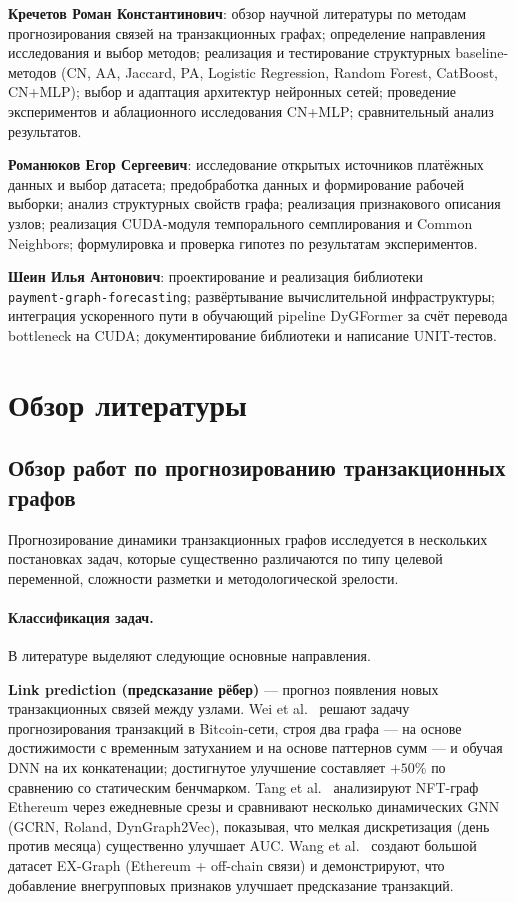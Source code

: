 \documentclass[a4paper,12pt]{extarticle}
\begin{document}
\textbf{Кречетов Роман Константинович}: 
обзор научной литературы по методам прогнозирования связей на транзакционных графах; 
определение направления исследования и выбор методов; 
реализация и тестирование структурных baseline-методов (CN, AA, Jaccard, PA, Logistic Regression, Random Forest, CatBoost, CN+MLP); 
выбор и адаптация архитектур нейронных сетей; 
проведение экспериментов и аблационного исследования CN+MLP; 
сравнительный анализ результатов.

\textbf{Романюков Егор Сергеевич}: исследование открытых источников платёжных данных и выбор датасета; 
предобработка данных и формирование рабочей выборки; 
анализ структурных свойств графа; реализация признакового описания узлов; 
реализация CUDA-модуля темпорального семплирования и Common Neighbors;
формулировка и проверка гипотез по результатам экспериментов. 

\textbf{Шеин Илья Антонович}: проектирование и реализация библиотеки \\ \texttt{payment-graph-forecasting}; 
развёртывание вычислительной инфраструктуры; 
интеграция ускоренного пути в обучающий pipeline DyGFormer за счёт перевода bottleneck на CUDA; 
документирование библиотеки и написание UNIT-тестов.


\newpage

\section*{Обзор литературы}


\subsection*{Обзор работ по прогнозированию транзакционных графов}

Прогнозирование динамики транзакционных графов исследуется в нескольких постановках задач, которые существенно различаются по типу целевой переменной, сложности разметки и методологической зрелости.

\paragraph{Классификация задач.}
В литературе выделяют следующие основные направления.

\textbf{Link prediction (предсказание рёбер)} --- прогноз появления новых транзакционных связей между узлами. Wei et al.~\cite{wei2022bitcoin} решают задачу прогнозирования транзакций в Bitcoin-сети, строя два графа --- на основе достижимости с временным затуханием и на основе паттернов сумм --- и обучая DNN на их конкатенации; достигнутое улучшение составляет $+50\%$ по сравнению со статическим бенчмарком. Tang et al.~\cite{tang2023nft} анализируют NFT-граф Ethereum через ежедневные срезы и сравнивают несколько динамических GNN (GCRN, Roland, DynGraph2Vec), показывая, что мелкая дискретизация (день против месяца) существенно улучшает AUC. Wang et al.~\cite{wang2023exgraph} создают большой датасет EX-Graph (Ethereum + off-chain связи) и демонстрируют, что добавление внегрупповых признаков улучшает предсказание транзакций.
\end{document}

